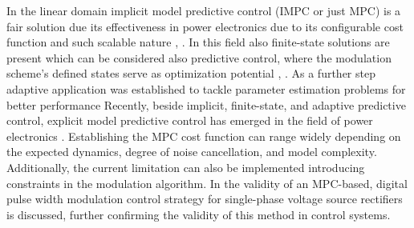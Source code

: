    In the linear domain implicit model predictive control (IMPC or just MPC) is a fair solution due its effectiveness in power electronics due to its configurable cost function and such scalable nature \cite{kelemen2010constrained}, \cite{ahmed2014model}. In this field also finite-state solutions are present which can be considered also predictive control, where the modulation scheme’s defined states serve as optimization potential \cite{rivera2013predictive}, \cite{godlewska2015predictive}. As a further step adaptive application was established to tackle parameter estimation problems for better performance \cite{muthukumar2016adaptive}
    Recently, beside implicit, finite-state, and adaptive predictive control, explicit model predictive control has emerged in the field of power electronics \cite{kutasi2010constrained}. Establishing the MPC cost function can range widely depending on the expected dynamics, degree of noise cancellation, and model complexity. Additionally, the current limitation can also be implemented introducing constraints in the modulation algorithm.
    In \cite{ahmed2014model} the validity of an MPC-based, digital pulse width modulation control strategy for single-phase voltage source rectifiers is discussed, further confirming the validity of this method in control systems.\\
	